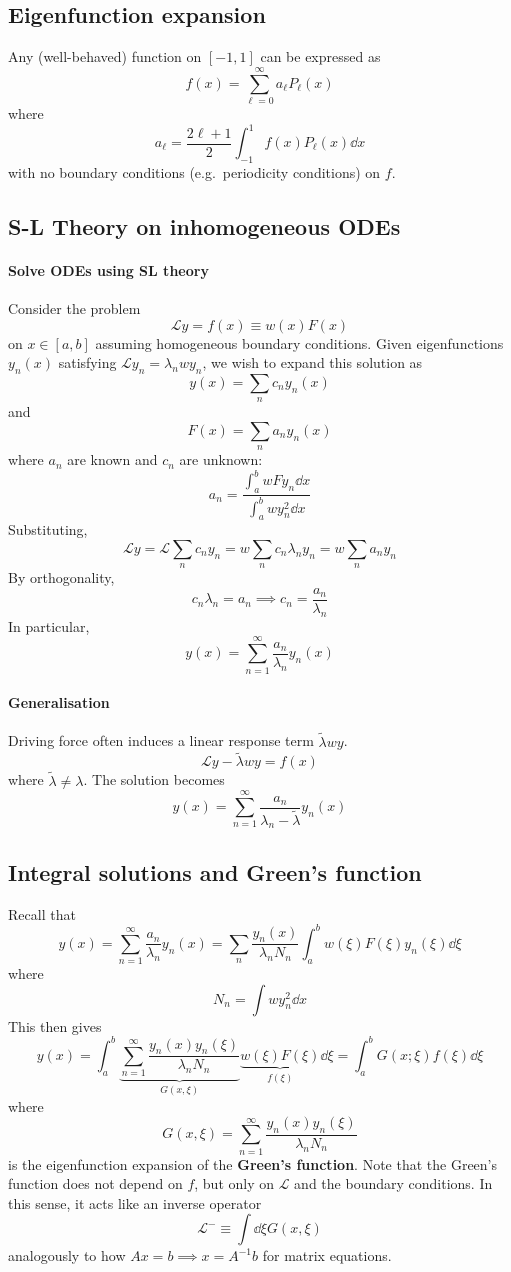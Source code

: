 \documentclass[a4paper]{article}
\begin{document}
\subsection{Eigenfunction expansion}
Any (well-behaved) function on \( [-1,1] \) can be expressed as
\[
	f(x) = \sum_{\ell = 0}^\infty a_\ell P_\ell(x)
\]
where
\[
	a_\ell = \frac{2\ell + 1}{2} \int_{-1}^1 f(x) P_\ell(x) \dd{x}
\]
with no boundary conditions (e.g.\ periodicity conditions) on \( f \).

\subsection{S-L Theory on inhomogeneous ODEs}

\paragraph{Solve ODEs using SL theory} Consider the problem
\[
	\mathcal L y = f(x) \equiv w(x) F(x)
\]
on \( x \in [a,b] \) assuming homogeneous boundary conditions.
Given eigenfunctions \( y_n(x) \) satisfying \( \mathcal L y_n = \lambda_n w y_n \), we wish to expand this solution as
\[
	y(x) = \sum_n c_n y_n(x)
\]
and
\[
	F(x) = \sum_n a_n y_n(x)
\]
where \( a_n \) are known and \( c_n \) are unknown:
\[
	a_n = \frac{\int_a^b w F y_n \dd{x}}{\int_a^b w y_n^2 \dd{x}}
\]
Substituting,
\[
	\mathcal L y = \mathcal L \sum_n c_n y_n = w \sum_n c_n \lambda_n y_n = w \sum_n a_n y_n
\]
By orthogonality,
\[
	c_n \lambda_n = a_n \implies c_n = \frac{a_n}{\lambda_n}
\]
In particular,
\[
	y(x) = \sum_{n=1}^\infty \frac{a_n}{\lambda_n}y_n(x)
\]
\paragraph{Generalisation} Driving force often induces a linear response term \( \widetilde\lambda w y \).
\[
	\mathcal L y - \widetilde \lambda w y = f(x)
\]
where \( \widetilde \lambda \neq \lambda \). 
The solution becomes
\[
	y(x) = \sum_{n=1}^\infty \frac{a_n}{\lambda_n - \widetilde \lambda} y_n(x)
\]

\subsection{Integral solutions and Green's function}
Recall that
\[
	y(x) = \sum_{n=1}^\infty \frac{a_n}{\lambda_n} y_n(x) = \sum_n \frac{y_n(x)}{\lambda_n  N_n} \int_a^b w(\xi) F(\xi) y_n(\xi) \dd{\xi}
\]
where
\[
	N_n = \int w y_n^2 \dd{x}
\]
This then gives
\[
	y(x) = \int_a^b \underbrace{\sum_{n=1}^\infty \frac{y_n(x) y_n(\xi)}{\lambda_n N_n}}_{G(x,\xi)} \underbrace{w(\xi) F(\xi)}_{f(\xi)} \dd{\xi} = \int_a^b G(x;\xi) f(\xi) \dd{\xi}
\]
where
\[
	G(x,\xi) = \sum_{n=1}^\infty \frac{y_n(x) y_n(\xi)}{\lambda_n N_n}
\]
is the eigenfunction expansion of the \textbf{Green's function}.
Note that the Green's function does not depend on \( f \), but only on \( \mathcal L \) and the boundary conditions.
In this sense, it acts like an inverse operator
\[
	\mathcal L^- \equiv \int \dd{\xi} G(x,\xi)
\]
analogously to how \( Ax = b \implies x = A^{-1} b \) for matrix equations.
\end{document}
